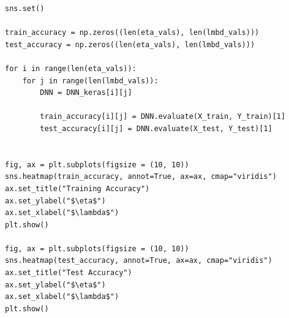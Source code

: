 \documentclass{beamer}
\begin{document}
\begin{frame}
\begin{verbatim}
sns.set()

train_accuracy = np.zeros((len(eta_vals), len(lmbd_vals)))
test_accuracy = np.zeros((len(eta_vals), len(lmbd_vals)))

for i in range(len(eta_vals)):
    for j in range(len(lmbd_vals)):
        DNN = DNN_keras[i][j]

        train_accuracy[i][j] = DNN.evaluate(X_train, Y_train)[1]
        test_accuracy[i][j] = DNN.evaluate(X_test, Y_test)[1]

        
fig, ax = plt.subplots(figsize = (10, 10))
sns.heatmap(train_accuracy, annot=True, ax=ax, cmap="viridis")
ax.set_title("Training Accuracy")
ax.set_ylabel("$\eta$")
ax.set_xlabel("$\lambda$")
plt.show()

fig, ax = plt.subplots(figsize = (10, 10))
sns.heatmap(test_accuracy, annot=True, ax=ax, cmap="viridis")
ax.set_title("Test Accuracy")
ax.set_ylabel("$\eta$")
ax.set_xlabel("$\lambda$")
plt.show()

\end{verbatim}
\end{frame}
\end{document}
